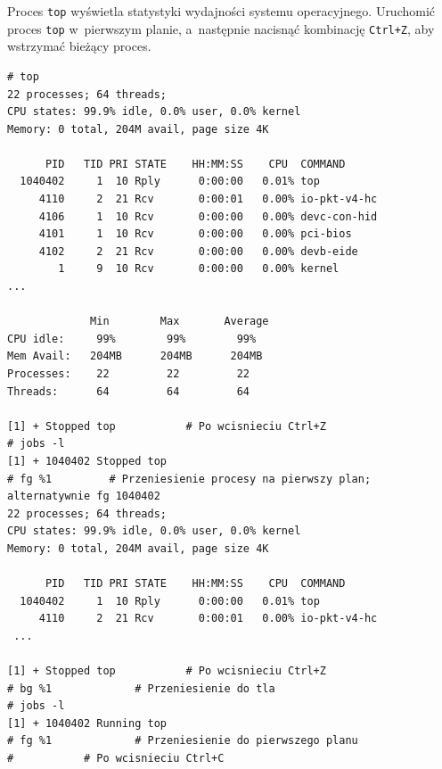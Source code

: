 \begin{example}

Proces \lstinline[style=MyBashStyle]{top} wyświetla statystyki wydajności systemu operacyjnego. Uruchomić proces \lstinline[style=MyBashStyle]{top} w~pierwszym planie, a~następnie nacisnąć kombinację \mbox{\lstinline[style=MyBashStyle]{Ctrl+Z}}, aby wstrzymać bieżący proces.

\begin{lstlisting}[style=MyBashStyle]
# top
22 processes; 64 threads;
CPU states: 99.9% idle, 0.0% user, 0.0% kernel
Memory: 0 total, 204M avail, page size 4K

      PID   TID PRI STATE    HH:MM:SS    CPU  COMMAND
  1040402     1  10 Rply      0:00:00   0.01% top
     4110     2  21 Rcv       0:00:01   0.00% io-pkt-v4-hc
     4106     1  10 Rcv       0:00:00   0.00% devc-con-hid
     4101     1  10 Rcv       0:00:00   0.00% pci-bios
     4102     2  21 Rcv       0:00:00   0.00% devb-eide
        1     9  10 Rcv       0:00:00   0.00% kernel
...

             Min        Max       Average
CPU idle:     99%        99%        99%
Mem Avail:   204MB      204MB      204MB
Processes:    22         22         22
Threads:      64         64         64

[1] + Stopped top 			# Po wcisnieciu Ctrl+Z
# jobs -l
[1] + 1040402 Stopped top
# fg %1			# Przeniesienie procesy na pierwszy plan; alternatywnie fg 1040402
22 processes; 64 threads;
CPU states: 99.9% idle, 0.0% user, 0.0% kernel
Memory: 0 total, 204M avail, page size 4K

      PID   TID PRI STATE    HH:MM:SS    CPU  COMMAND
  1040402     1  10 Rply      0:00:00   0.01% top
     4110     2  21 Rcv       0:00:01   0.00% io-pkt-v4-hc
 ...

[1] + Stopped top 			# Po wcisnieciu Ctrl+Z
# bg %1 			# Przeniesienie do tla
# jobs -l
[1] + 1040402 Running top
# fg %1 			# Przeniesienie do pierwszego planu
# 			# Po wcisnieciu Ctrl+C
\end{lstlisting}

\end{example}


